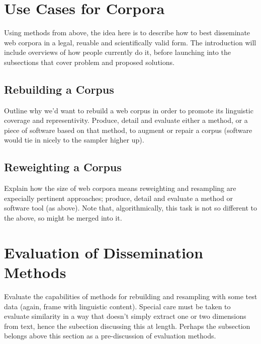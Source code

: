 \section{Use Cases for Corpora}
Using methods from above, the idea here is to describe how to best disseminate web corpora in a legal, reuable and scientifically valid form.  The introduction will include overviews of how people currently do it, before launching into the subsections that cover problem and proposed solutions.


\subsection{Rebuilding a Corpus}
Outline why we'd want to rebuild a web corpus in order to promote its linguistic coverage and representivity.  Produce, detail and evaluate either a method, or a piece of software based on that method, to augment or repair a corpus (software would tie in nicely to the sampler higher up).


\subsection{Reweighting a Corpus}
Explain how the size of web corpora means reweighting and resampling are expecially pertinent approaches; produce, detail and evaluate a method or software tool (as above).  Note that, algorithmically, this task is not so different to the above, so might be merged into it.


\section{Evaluation of Dissemination Methods}
Evaluate the capabilities of methods for rebuilding and resampling with some test data (again, frame with linguistic content).  Special care must be taken to evaluate similarity in a way that doesn't simply extract one or two dimensions from text, hence the subection discussing this at length.  Perhaps the subsection belongs above this section as a pre-discussion of evaluation methods.


